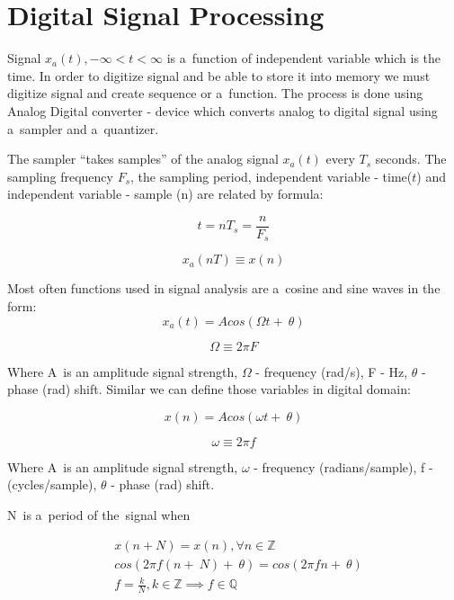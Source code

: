 \chapter{Digital Signal Processing}

Signal $x_a(t), -\infty < t < \infty$ is a~function of independent variable which is the time. In order to digitize signal and be able to store it into memory we must digitize signal and create sequence or a~function. The process is done using Analog Digital converter - device which converts analog to digital signal using a~sampler and a~quantizer.

The sampler ``takes samples'' of the analog signal $x_a(t)$ every $T_s$ seconds. The sampling frequency $F_s$, the sampling period, independent variable - time($t$) and independent variable - sample (n) are related by formula:

\begin{equation}
	t = nT_s = \frac{n}{F_s}
\end{equation}

\begin{equation}
	x_a(nT) \equiv x(n)
\end{equation}


Most often functions used in signal analysis are a~cosine and sine waves in the form:
\begin{equation}
	x_a(t) = Acos(\Omega t +~\theta)
\end{equation}

\begin{equation}
	\Omega \equiv 2\pi F
\end{equation}

Where A~is an amplitude signal strength, $\Omega$ - frequency (rad/s), F - Hz, $\theta$ - phase (rad) shift.  
Similar we can define those variables in digital domain:

\begin{equation}
	x(n) = Acos(\omega t +~\theta)
\end{equation}

\begin{equation}
	\omega \equiv 2\pi f
\end{equation}


Where A~is an amplitude signal strength, $\omega$ - frequency (radians/sample), f - (cycles/sample), $\theta$ - phase (rad) shift.  

N~is a~period of the~signal when


\begin{align}
& x(n+N) = x(n), \forall n \in \mathbb{Z} \\
& cos(2\pi f (n +~N) +~\theta) = cos(2\pi f n +~\theta) \\
& f = \frac{k}{N}, k \in \mathbb{Z} \implies f \in \mathbb{Q}
\end{align}

